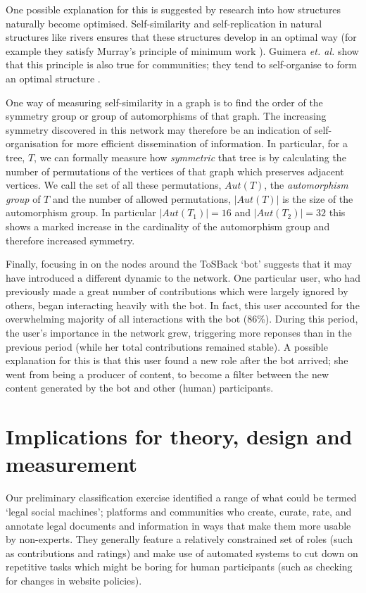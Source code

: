\documentclass{sig-alternate}
\begin{document}
One possible explanation for this is suggested by research into how structures naturally become optimised. Self-similarity and self-replication in natural structures like rivers ensures that these structures develop in an optimal way (for example they satisfy Murray's principle of minimum work \cite{murray:min}). Guimera \emph{et. al.} show that this principle is also true for communities; they tend to self-organise to form an optimal structure \cite{guimera:comm}.

One way of measuring self-similarity in a graph is to find the order of the symmetry group or group of automorphisms of that graph. The increasing symmetry discovered in this network may therefore be an indication of self-organisation for more efficient dissemination of information. In particular, for a tree, $T$, we can formally measure how \emph{symmetric} that tree is by calculating the number of permutations of the vertices of that graph which preserves adjacent vertices. We call the set of all these permutations, $Aut(T)$, the \emph{automorphism group} of $T$ and the number of allowed permutations, $|Aut(T)|$ is the size of the automorphism group. In particular $|Aut(T_{1})| = 16$ and $|Aut(T_{2})|  = 32$ this shows a marked increase in the cardinality of the automorphism group and therefore increased symmetry.

Finally, focusing in on the nodes around the ToSBack `bot' suggests that it may have introduced a different dynamic to the network. One particular user, who had previously made a great number of contributions which were largely ignored by others, began interacting heavily with the bot. In fact, this user accounted for the overwhelming majority of all interactions with the bot (86\%). During this period, the user's importance in the network grew, triggering more reponses than in the previous period (while her total contributions remained stable). A possible explanation for this is that this user found a new role after the bot arrived; she went from being a producer of content, to become a filter between the new content generated by the bot and other (human) participants.

\section{Implications for theory, design and measurement}

Our preliminary classification exercise identified a range of what could be termed `legal social machines'; platforms and communities who create, curate, rate, and annotate legal documents and information in ways that make them more usable by non-experts. They generally feature a relatively constrained set of roles (such as contributions and ratings) and make use of automated systems to cut down on repetitive tasks which might be boring for human participants (such as checking for changes in website policies).
\end{document}
